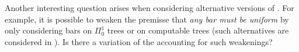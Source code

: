 \documentclass[a4paper,UKenglish,cleveref, autoref, thm-restate]{lipics-v2021}
\begin{document}


Another interesting question arises when considering alternative versions of \FT. For example, it is possible to weaken the premisse that \emph{any bar must be uniform} by only considering bars on $\Pi_0^1$ trees or on computable trees (such alternatives are considered in \cite{LubRat13}).
Is there a variation of the  accounting for such weakenings?



%
% 
\end{document}
